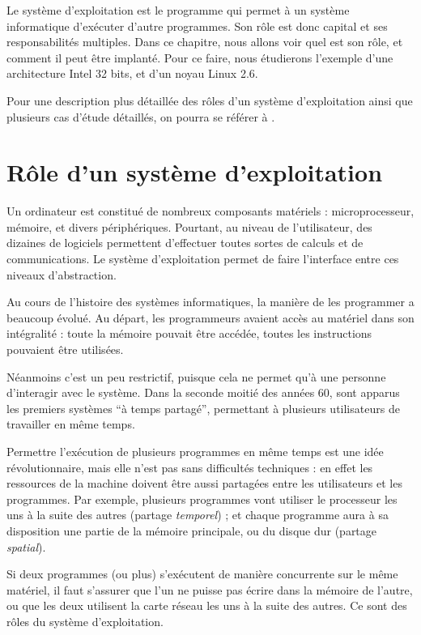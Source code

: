 Le système d'exploitation est le programme qui permet à un système informatique
d'exécuter d'autre programmes. Son rôle est donc capital et ses responsabilités
multiples. Dans ce chapitre, nous allons voir quel est son rôle, et comment il
peut être implanté. Pour ce faire, nous étudierons l'exemple d'une architecture
Intel 32 bits, et d'un noyau Linux 2.6.

Pour une description plus détaillée des rôles d'un système d'exploitation ainsi
que plusieurs cas d'étude détaillés, on pourra se référer à \cite{tanenbaum}.

\section{Rôle d'un système d'exploitation}

Un ordinateur est constitué de nombreux composants matériels : microprocesseur,
mémoire, et divers périphériques. Pourtant, au niveau de l'utilisateur, des
dizaines de logiciels permettent d'effectuer toutes sortes de calculs et de
communications. Le système d'exploitation permet de faire l'interface entre ces
niveaux d'abstraction.

Au cours de l'histoire des systèmes informatiques, la manière de les programmer
a beaucoup évolué. Au départ, les programmeurs avaient accès au matériel dans
son intégralité : toute la mémoire pouvait être accédée, toutes les instructions
pouvaient être utilisées.

Néanmoins c'est un peu restrictif, puisque cela ne permet qu'à une personne
d'interagir avec le système. Dans la seconde moitié des années 60, sont apparus
les premiers systèmes ``à temps partagé'', permettant à plusieurs utilisateurs
de travailler en même temps.

Permettre l'exécution de plusieurs programmes en même temps est une idée
révolutionnaire, mais elle n'est pas sans difficultés techniques : en effet les
ressources de la machine doivent être aussi partagées entre les utilisateurs et
les programmes. Par exemple, plusieurs programmes vont utiliser le processeur
les uns à la suite des autres (partage \emph{temporel}) ; et chaque programme
aura à sa disposition une partie de la mémoire principale, ou du disque dur
(partage \emph{spatial}).

Si deux programmes (ou plus) s'exécutent de manière concurrente sur le même
matériel, il faut s'assurer que l'un ne puisse pas écrire dans la mémoire de
l'autre, ou que les deux utilisent la carte réseau les uns à la suite des
autres. Ce sont des rôles du système d'exploitation.

